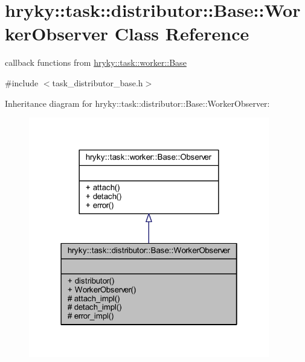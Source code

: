 \hypertarget{classhryky_1_1task_1_1distributor_1_1_base_1_1_worker_observer}{\section{hryky\-:\-:task\-:\-:distributor\-:\-:Base\-:\-:Worker\-Observer Class Reference}
\label{classhryky_1_1task_1_1distributor_1_1_base_1_1_worker_observer}
}


callback functions from \hyperlink{classhryky_1_1task_1_1worker_1_1_base}{hryky\-::task\-::worker\-::\-Base}  




{\ttfamily \#include $<$task\-\_\-distributor\-\_\-base.\-h$>$}



Inheritance diagram for hryky\-:\-:task\-:\-:distributor\-:\-:Base\-:\-:Worker\-Observer\-:\nopagebreak
\begin{figure}[H]
\begin{center}
\leavevmode
\includegraphics[width=298pt]{classhryky_1_1task_1_1distributor_1_1_base_1_1_worker_observer__inherit__graph}
\end{center}
\end{figure}
